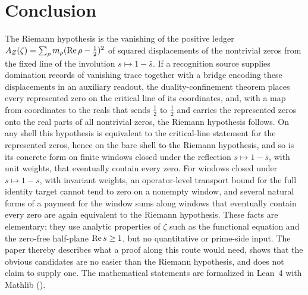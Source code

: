 \section{Conclusion}
\label{sec:conclusion}

The Riemann hypothesis is the vanishing of the positive ledger
\(A_{Z}(\zeta)=\sum_\rho m_\rho(\operatorname{Re}\rho-\frac12)^2\) of squared displacements of
the nontrivial zeros from the fixed line of the involution
\(s\mapsto1-\bar s\).  If a recognition source supplies domination
records of vanishing trace together with a bridge encoding these displacements in an auxiliary
readout, the duality-confinement theorem places every represented zero on the
critical line of its coordinates, and, with a map from coordinates to the reals that sends \(\frac12\) to
\(\frac12\) and carries the represented zeros onto the real parts of all
nontrivial zeros, the Riemann hypothesis follows.  On any shell this
hypothesis is equivalent to the critical-line statement for the
represented zeros, hence on the bare shell to the Riemann hypothesis, and so
is its concrete form on finite windows closed under the reflection
\(s\mapsto1-\bar s\), with unit weights, that eventually contain every
zero.  For windows closed under \(s\mapsto1-s\), with invariant weights, an
operator-level transport bound for the full identity target cannot
tend to zero on a nonempty window, and several natural forms of a
payment for the window sums along windows that eventually contain
every zero are again equivalent to the Riemann hypothesis.  These facts are elementary; they use analytic properties of \(\zeta\)
such as the functional equation and the zero-free half-plane
\(\operatorname{Re} s\geq1\), but no quantitative or prime-side input.  The paper thereby
describes what a proof along this route would need, shows that the
obvious candidates are no easier than the Riemann hypothesis, and does
not claim to supply one.  The mathematical statements are formalized in Lean~4 with Mathlib
().
